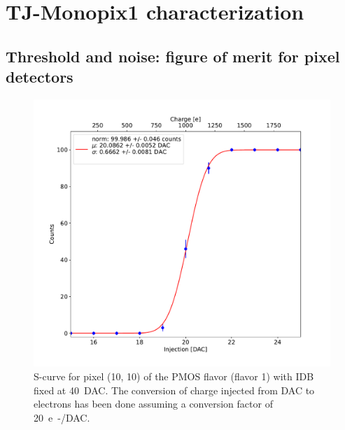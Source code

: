 

\section{TJ-Monopix1 characterization}
    

    \subsection{Threshold and noise: figure of merit for pixel detectors}
        \begin{figure}[h!]
            \centering
            \includegraphics[width=.6\linewidth]{figures/charaterization/scurve.pdf}
            \caption{S-curve for pixel (10, 10) of the PMOS flavor (flavor 1) with IDB fixed at \SI{40}{DAC}. The conversion of charge injected from DAC to electrons has been done assuming a conversion factor of \SI{20}{e-/DAC}. }
            \label{fig:scurve}
        \end{figure}   

